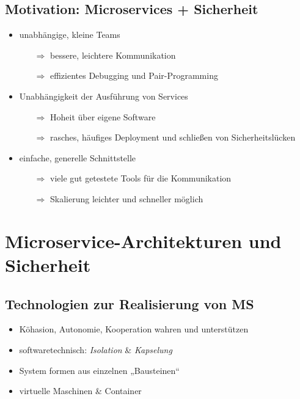 \documentclass{beamer}
\begin{document}
\subsection{Motivation: Microservices + Sicherheit}
\begin{frame}{\insertsubsection}
	\begin{itemize}
		\item unabhängige, kleine Teams
		\begin{itemize}
			\item[$\Rightarrow$] bessere, leichtere Kommunikation
			\item[$\Rightarrow$] effizientes Debugging und Pair-Programming
		\end{itemize}
		\item Unabhängigkeit der Ausführung von Services
		\begin{itemize}
			\item[$\Rightarrow$] Hoheit über eigene Software
			\item[$\Rightarrow$] rasches, häufiges Deployment und schließen von Sicherheitslücken
		\end{itemize}
		\item einfache, generelle Schnittstelle
		\begin{itemize}
			\item[$\Rightarrow$] viele gut getestete Tools für die Kommunikation
			\item[$\Rightarrow$] Skalierung leichter und schneller möglich
		\end{itemize}
	\end{itemize}
\end{frame}

	
\section{Microservice-Architekturen und Sicherheit}

\subsection{Technologien zur Realisierung von MS}
\begin{frame}{\insertsubsection}
	\begin{itemize}
		\setlength\itemsep{2em}
		\item Köhasion, Autonomie, Kooperation wahren und unterstützen
		\item softwaretechnisch: \textit{Isolation} \& \textit{Kapselung}
		\item System formen aus einzelnen „Bausteinen“
		\item virtuelle Maschinen \& Container
	\end{itemize}
\end{frame}
\end{document}
